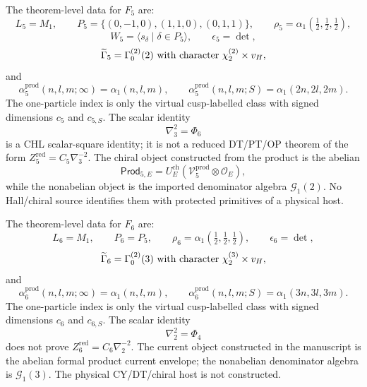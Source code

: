 \begin{proposition}[Row \(F_5=\nabla_3\)]
The theorem-level data for \(F_5\) are:
\[
L_5=M_1,\qquad
P_5=\{(0,-1,0),(1,1,0),(0,1,1)\},
\qquad
\rho_5=\alpha_1(\tfrac12,\tfrac12,\tfrac12),
\]
\[
W_5=\langle s_\delta\mid \delta\in P_5\rangle,\qquad
\epsilon_5=\det,
\]
\[
\widetilde{\Gamma}_5=\Gamma_0^{(2)}(2)\ \hbox{with character}\
\chi_2^{(2)}\times v_H,
\]
and
\[
\alpha_5^{\mathrm{prod}}(n,l,m;\infty)=\alpha_1(n,l,m),\qquad
\alpha_5^{\mathrm{prod}}(n,l,m;S)=\alpha_1(2n,2l,2m).
\]
The one-particle index is only the virtual cusp-labelled class with
signed dimensions \(c_5\) and \(c_{5,S}\).  The scalar identity
\[
\nabla_3^2=\Phi_6
\]
is a CHL scalar-square identity; it is not a reduced DT/PT/OP theorem of
the form \(Z_5^{\mathrm{red}}=C_5\nabla_3^{-2}\).  The chiral object
constructed from the product is the abelian
\[
\mathsf{Prod}_{5,E}=U_E^{\mathrm{ch}}
(\mathcal V_5^{\mathrm{prod}}\otimes\mathcal O_E),
\]
while the nonabelian object is the imported denominator algebra
\(\mathcal G_1(2)\).  No Hall/chiral source identifies them with
protected primitives of a physical host.
\end{proposition}

\begin{proposition}[Row \(F_6=\nabla_2\)]
The theorem-level data for \(F_6\) are:
\[
L_6=M_1,\qquad P_6=P_5,\qquad
\rho_6=\alpha_1(\tfrac12,\tfrac12,\tfrac12),\qquad
\epsilon_6=\det,
\]
\[
\widetilde{\Gamma}_6=\Gamma_0^{(2)}(3)\ \hbox{with character}\
\chi_2^{(3)}\times v_H,
\]
and
\[
\alpha_6^{\mathrm{prod}}(n,l,m;\infty)=\alpha_1(n,l,m),\qquad
\alpha_6^{\mathrm{prod}}(n,l,m;S)=\alpha_1(3n,3l,3m).
\]
The one-particle index is only the virtual cusp-labelled class with
signed dimensions \(c_6\) and \(c_{6,S}\).  The scalar identity
\[
\nabla_2^2=\Phi_4
\]
does not prove \(Z_6^{\mathrm{red}}=C_6\nabla_2^{-2}\).  The current
object constructed in the manuscript is the abelian formal product
current envelope; the nonabelian denominator algebra is
\(\mathcal G_1(3)\).  The physical CY/DT/chiral host is not constructed.
\end{proposition}


